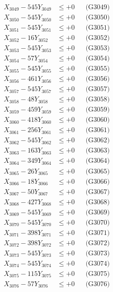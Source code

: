 \documentclass[a4paper,10pt]{article}
\begin{document}
{\begin{align}
X_{3049} - 545Y_{3049} &\leq +0 && \text{(G3049)} \\
X_{3050} - 545Y_{3050} &\leq +0 && \text{(G3050)} \\
\allowbreak
X_{3051} - 545Y_{3051} &\leq +0 && \text{(G3051)} \\
X_{3052} - 16Y_{3052} &\leq +0 && \text{(G3052)} \\
X_{3053} - 545Y_{3053} &\leq +0 && \text{(G3053)} \\
X_{3054} - 57Y_{3054} &\leq +0 && \text{(G3054)} \\
X_{3055} - 545Y_{3055} &\leq +0 && \text{(G3055)} \\
X_{3056} - 461Y_{3056} &\leq +0 && \text{(G3056)} \\
X_{3057} - 545Y_{3057} &\leq +0 && \text{(G3057)} \\
X_{3058} - 48Y_{3058} &\leq +0 && \text{(G3058)} \\
X_{3059} - 459Y_{3059} &\leq +0 && \text{(G3059)} \\
X_{3060} - 418Y_{3060} &\leq +0 && \text{(G3060)} \\
\allowbreak
X_{3061} - 256Y_{3061} &\leq +0 && \text{(G3061)} \\
X_{3062} - 545Y_{3062} &\leq +0 && \text{(G3062)} \\
X_{3063} - 163Y_{3063} &\leq +0 && \text{(G3063)} \\
X_{3064} - 349Y_{3064} &\leq +0 && \text{(G3064)} \\
X_{3065} - 26Y_{3065} &\leq +0 && \text{(G3065)} \\
X_{3066} - 18Y_{3066} &\leq +0 && \text{(G3066)} \\
X_{3067} - 50Y_{3067} &\leq +0 && \text{(G3067)} \\
X_{3068} - 427Y_{3068} &\leq +0 && \text{(G3068)} \\
X_{3069} - 545Y_{3069} &\leq +0 && \text{(G3069)} \\
X_{3070} - 545Y_{3070} &\leq +0 && \text{(G3070)} \\
\allowbreak
X_{3071} - 398Y_{3071} &\leq +0 && \text{(G3071)} \\
X_{3072} - 398Y_{3072} &\leq +0 && \text{(G3072)} \\
X_{3073} - 545Y_{3073} &\leq +0 && \text{(G3073)} \\
X_{3074} - 545Y_{3074} &\leq +0 && \text{(G3074)} \\
X_{3075} - 115Y_{3075} &\leq +0 && \text{(G3075)} \\
X_{3076} - 57Y_{3076} &\leq +0 && \text{(G3076)} \\

\end{align}}
\end{document}
